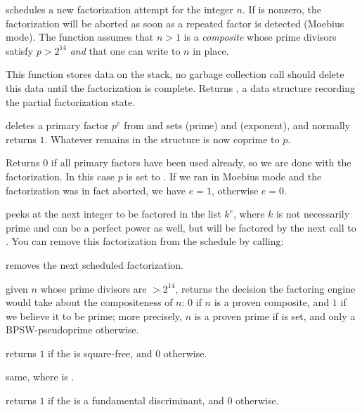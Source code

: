  schedules a new factorization
attempt for the integer $n$. If  is nonzero, the factorization
will be aborted as soon as a repeated factor is detected (Moebius mode).
The function assumes that $n > 1$ is a \emph{composite}  whose prime
divisors satisfy $p > 2^{14}$ \emph{and} that one can write to $n$ in place.

This function stores data on the stack, no garbage collection call should
delete this data until the factorization is complete. Returns ,
a data structure recording the partial factorization state.

 deletes a primary factor
$p^e$ from  and sets  (prime) and  (exponent), and
normally returns $1$. Whatever remains in the  structure is now
coprime to $p$.

Returns $0$ if all primary factors have been used already, so we are done
with the factorization. In this case $p$ is set to . If we ran in
Moebius mode and the factorization was in fact aborted, we have $e = 1$,
otherwise $e = 0$.

 peeks at the next integer
to be factored in the list $k^e$, where $k$ is not necessarily prime
and can be a perfect power as well, but will be factored by the next call to
. You can remove this factorization from the schedule by
calling:

 removes the next scheduled factorization.

 given $n$ whose prime divisors are $> 2^{14}$,
returns the decision the factoring engine would take about the compositeness
of $n$: $0$ if $n$ is a proven composite, and $1$ if we believe it to be
prime; more precisely, $n$ is a proven prime if  is
set, and only a BPSW-pseudoprime otherwise.


 returns $1$ if the  
is square-free, and $0$ otherwise.

 same, where  is
.

 returns $1$ if the  
is a fundamental discriminant, and $0$ otherwise.

